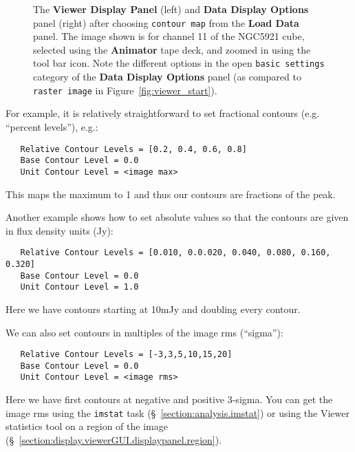  
\begin{figure}[h!]
\begin{center}
\caption{\label{fig:viewer_con} The {\bf Viewer Display Panel}
(left) and {\bf Data Display Options} panel (right) after choosing
{\tt contour map} from the {\bf Load Data} panel.  The
image shown is for channel 11 of the NGC5921 cube, selected using
the {\bf Animator} tape deck, and zoomed in using the tool bar icon.
Note the different options in the open {\tt basic settings} category
of the {\bf Data Display Options} panel (as compared to {\tt raster image} in
Figure~\ref{fig:viewer_start}).} 
\hrulefill
\end{center}
\end{figure}

For example, it is relatively straightforward to set fractional
contours (e.g. ``percent levels''), e.g.:
\small
\begin{verbatim}
   Relative Contour Levels = [0.2, 0.4, 0.6, 0.8]
   Base Contour Level = 0.0
   Unit Contour Level = <image max>
\end{verbatim}
\normalsize
This maps the maximum to 1 and thus our contours are fractions of
the peak.

Another example shows how to set absolute values so that the contours
are given in flux density units (Jy):
\small
\begin{verbatim}
   Relative Contour Levels = [0.010, 0.0.020, 0.040, 0.080, 0.160, 0.320]
   Base Contour Level = 0.0
   Unit Contour Level = 1.0
\end{verbatim}
\normalsize
Here we have contours starting at 10mJy and doubling every contour.

We can also set contours in multiples of the image rms (``sigma''):
\small
\begin{verbatim}
   Relative Contour Levels = [-3,3,5,10,15,20]
   Base Contour Level = 0.0
   Unit Contour Level = <image rms>
\end{verbatim}
\normalsize
Here we have first contours at negative and positive 3-sigma.
You can get the image rms using the {\tt imstat} task 
(\S~\ref{section:analysis.imstat}) or using the Viewer statistics
tool on a region of the image 
(\S~\ref{section:display.viewerGUI.displaypanel.region}).

